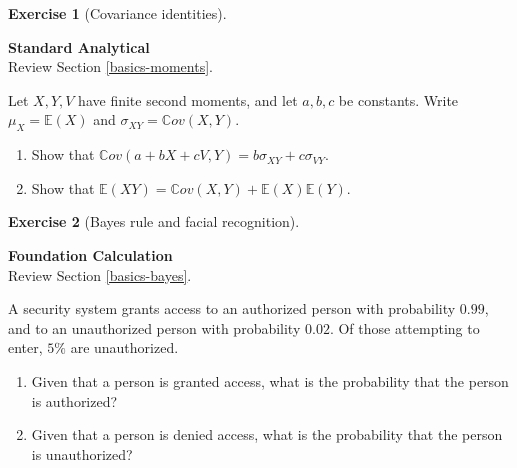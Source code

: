 \documentclass[
  11pt,
]{book}
\providecommand{\tightlist}{%
  \setlength{\itemsep}{0pt}\setlength{\parskip}{0pt}}
\theoremstyle{definition}
\theoremstyle{definition}
\theoremstyle{definition}
\newtheorem{exercise}{Exercise}[chapter]
\theoremstyle{definition}
\theoremstyle{remark}
\begin{document}

\begin{exercisebox}

\begin{exercise}[Covariance identities]
\protect\hypertarget{exr:basics-covariance}{}\label{exr:basics-covariance}

\textbf{Standard \textbar{} Analytical}\\
Review Section \ref{basics-moments}.

Let \(X,Y,V\) have finite second moments, and let \(a,b,c\) be constants. Write \(\mu_X=\mathbb{E}(X)\) and \(\sigma_{XY}=\mathbb{C}ov(X,Y)\).

\begin{enumerate}
\def\labelenumi{\arabic{enumi}.}
\tightlist
\item
  Show that \(\mathbb{C}ov(a+bX+cV,Y)=b\sigma_{XY}+c\sigma_{VY}\).
\item
  Show that \(\mathbb{E}(XY)=\mathbb{C}ov(X,Y)+\mathbb{E}(X)\mathbb{E}(Y)\).
\end{enumerate}

\end{exercise}

\end{exercisebox}


\begin{exercisebox}

\begin{exercise}[Bayes rule and facial recognition]
\protect\hypertarget{exr:basics-bayes}{}\label{exr:basics-bayes}

\textbf{Foundation \textbar{} Calculation}\\
Review Section \ref{basics-bayes}.

A security system grants access to an authorized person with probability \(0.99\), and to an unauthorized person with probability \(0.02\). Of those attempting to enter, \(5\%\) are unauthorized.

\begin{enumerate}
\def\labelenumi{\arabic{enumi}.}
\tightlist
\item
  Given that a person is granted access, what is the probability that the person is authorized?
\item
  Given that a person is denied access, what is the probability that the person is unauthorized?
\end{enumerate}

\end{exercise}

\end{exercisebox}
\end{document}
